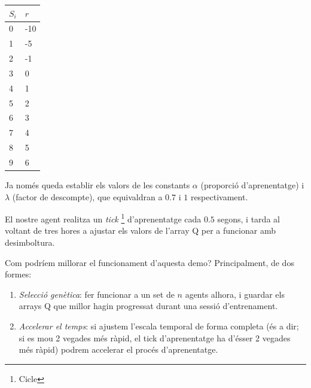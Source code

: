\begin{center} \label{tb:rewards}
    \begin{tabular}{| l | l |}
    \hline
    \(S_i\) & \(r\) \\ \hline
    0 & -10 \\ \hline
    1 & -5 \\ \hline
    2 & -1 \\ \hline
    3 & 0 \\ \hline
    4 & 1 \\ \hline
    5 & 2 \\ \hline
    6 & 3 \\ \hline
    7 & 4 \\ \hline
    8 & 5 \\ \hline
    9 & 6 \\ \hline
    \end{tabular}
\end{center}

Ja només queda establir els valors de les constants \(\alpha\) (proporció d'aprenentatge) i \(\lambda\) (factor de descompte), que equivaldran
a \(0.7\) i \(1\) respectivament.

El nostre agent realitza un \emph{tick} \footnote{Cicle} d'aprenentatge cada \(0.5\) segons, i tarda al voltant de tres hores a ajustar els
valors de l'array Q per a funcionar amb desimboltura.

Com podríem millorar el funcionament d'aquesta demo? Principalment, de dos formes:

\begin{enumerate}
\item \emph{Selecció genètica}: fer funcionar a un set de \(n\) agents alhora, i guardar els arrays Q que millor hagin progressat durant
una sessió d'entrenament.
\item \emph{Accelerar el temps}: si ajustem l'escala temporal de forma completa (és a dir; si es mou 2 vegades més ràpid, el tick d'aprenentatge
ha d'ésser 2 vegades més ràpid) podrem accelerar el procés d'aprenentatge.
\end{enumerate}













